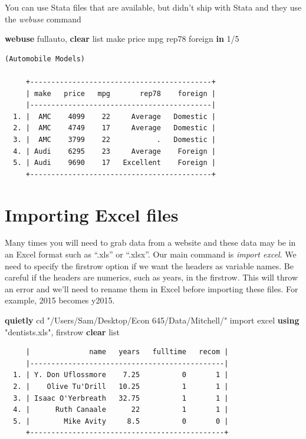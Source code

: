 \documentclass[
]{book}
\newenvironment{Shaded}{\begin{snugshade}}{\end{snugshade}}
\newcommand{\KeywordTok}[1]{\textcolor[rgb]{0.13,0.29,0.53}{\textbf{#1}}}
\newcommand{\NormalTok}[1]{#1}
\newcommand{\OtherTok}[1]{\textcolor[rgb]{0.56,0.35,0.01}{#1}}
\newcommand{\StringTok}[1]{\textcolor[rgb]{0.31,0.60,0.02}{#1}}
\begin{document}
You can use Stata files that are available, but didn't ship with Stata and
they use the \emph{webuse} command

\begin{Shaded}
\begin{Highlighting}[]
\KeywordTok{webuse}\NormalTok{ fullauto, }\KeywordTok{clear}
\OtherTok{list}\NormalTok{ make price mpg rep78 foreign }\KeywordTok{in}\NormalTok{ 1/5}
\end{Highlighting}
\end{Shaded}

\begin{verbatim}
(Automobile Models)

     +-------------------------------------------+
     | make   price   mpg       rep78    foreign |
     |-------------------------------------------|
  1. |  AMC    4099    22     Average   Domestic |
  2. |  AMC    4749    17     Average   Domestic |
  3. |  AMC    3799    22           .   Domestic |
  4. | Audi    6295    23     Average    Foreign |
  5. | Audi    9690    17   Excellent    Foreign |
     +-------------------------------------------+
\end{verbatim}

\section{Importing Excel files}\label{importing-excel-files}

Many times you will need to grab data from a website and these data may be in an Excel format such as ``.xls'' or ``.xlsx''. Our main command is \emph{import excel}. We need to specify the firstrow option if we want the headers as variable names. Be careful if the headers are numerics, such as years, in the firstrow. This will throw an error and we'll need to rename them in Excel before importing these files. For example, 2015 becomes y2015.

\begin{Shaded}
\begin{Highlighting}[]
\KeywordTok{quietly}\NormalTok{ cd }\StringTok{"/Users/Sam/Desktop/Econ 645/Data/Mitchell/"}
\NormalTok{import excel }\KeywordTok{using} \StringTok{"dentists.xls"}\NormalTok{, firstrow }\KeywordTok{clear}
\OtherTok{list} 
\end{Highlighting}
\end{Shaded}

\begin{verbatim}
     |              name   years   fulltime   recom |
     |----------------------------------------------|
  1. | Y. Don Uflossmore    7.25          0       1 |
  2. |    Olive Tu'Drill   10.25          1       1 |
  3. | Isaac O'Yerbreath   32.75          1       1 |
  4. |      Ruth Canaale      22          1       1 |
  5. |        Mike Avity     8.5          0       0 |
     +----------------------------------------------+
\end{verbatim}
\end{document}
